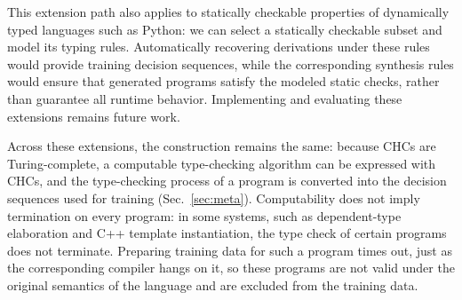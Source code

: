 This extension path also applies to statically checkable properties of dynamically typed languages such as Python: we can select a statically checkable subset and model its typing rules. Automatically recovering derivations under these rules would provide training decision sequences, while the corresponding synthesis rules would ensure that generated programs satisfy the modeled static checks, rather than guarantee all runtime behavior. Implementing and evaluating these extensions remains future work.

Across these extensions, the construction remains the same: because CHCs are Turing-complete, a computable type-checking algorithm can be expressed with CHCs, and the type-checking process of a program is converted into the decision sequences used for training (Sec.~\ref{sec:meta}). Computability does not imply termination on every program: in some systems, such as dependent-type elaboration and C++ template instantiation, the type check of certain programs does not terminate. Preparing training data for such a program times out, just as the corresponding compiler hangs on it, so these programs are not valid under the original semantics of the language and are excluded from the training data.
